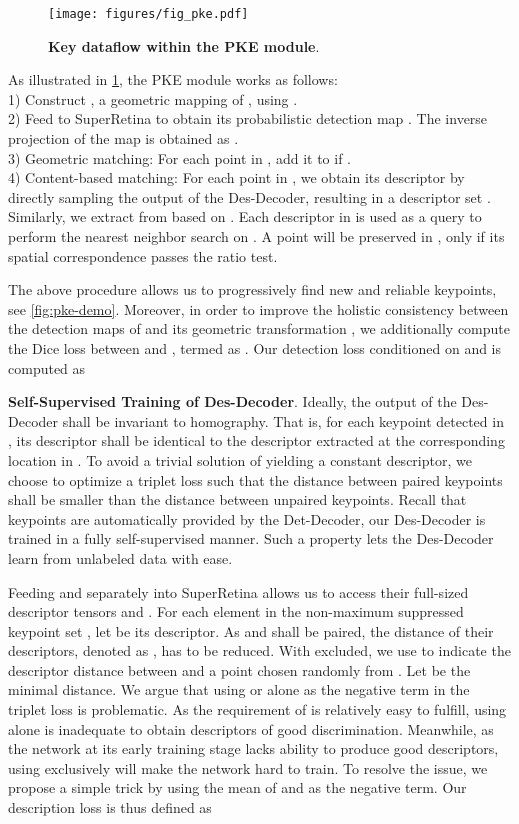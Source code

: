 \begin{figure}[htb!]
  \centering
\texttt{[image: figures/fig\_pke.pdf]}
   \caption{\textbf{Key dataflow within the PKE module}.}
   \label{fig:pke-flow}
\end{figure} 
As illustrated in \cref{fig:pke-flow}, the PKE module works as follows: \\
1) Construct , a geometric mapping of , using .\\
2) Feed  to SuperRetina to obtain its probabilistic detection map . The inverse projection of the map \wrt  is obtained as  .  \\
3) Geometric matching: For each point  in , add it to  if . \\
4) Content-based matching: For each point  in , we obtain its descriptor by directly sampling the output of the Des-Decoder, resulting in a descriptor set . Similarly, we extract  from  based on . Each descriptor in  is used as a query to perform the nearest neighbor search on . A point  will be preserved in , only if its spatial correspondence  passes the ratio test.

The above procedure allows us to progressively find new and reliable keypoints, see \cref{fig:pke-demo}. Moreover, in order to improve the holistic consistency between the detection maps of  and its geometric transformation , we additionally compute the Dice loss between  and , termed as .  Our detection loss  conditioned on   and  is computed as 



\textbf{Self-Supervised Training of Des-Decoder}. 
Ideally, the output of the Des-Decoder shall be invariant to homography. That is, for each keypoint  detected in , its descriptor shall be identical to the descriptor extracted at the corresponding location  in . To avoid a trivial solution of yielding a constant descriptor, we choose to optimize a triplet loss \cite{schroff2015facenet} such that the distance between paired keypoints shall be smaller than the distance between unpaired keypoints. Recall that  keypoints are automatically provided by the Det-Decoder, our Des-Decoder is trained in a fully self-supervised manner. Such a property lets the Des-Decoder learn from unlabeled data with ease.

Feeding  and  separately into SuperRetina allows us to access their full-sized descriptor tensors  and . For each element  in the non-maximum suppressed keypoint set , let  be its descriptor. As  and  shall be paired, the distance of their descriptors, denoted as , has to be reduced. With   excluded, we use  to indicate the descriptor distance between  and a point chosen randomly from . Let  be  the minimal distance. 
We argue that using  or   alone as the negative term in the triplet loss is problematic. As the requirement of  is relatively easy to fulfill, using  alone is inadequate to obtain descriptors of good discrimination. Meanwhile, as the network at its early training stage lacks ability to produce good descriptors, using  exclusively will make the network hard to train. To resolve the issue, we propose a simple  trick by using the mean of   and  as the negative term. Our description loss  is thus defined as

